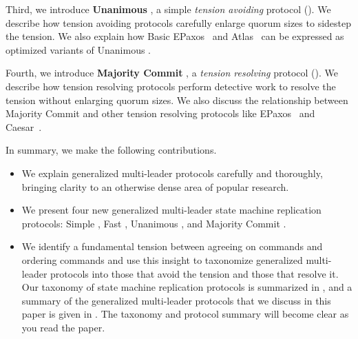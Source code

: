 Third, we introduce \textbf{Unanimous \BPaxos{}}, a simple \emph{tension
avoiding} protocol (). We describe how tension
avoiding protocols carefully enlarge quorum sizes to sidestep the tension. We
also explain how Basic EPaxos~\cite{moraru2013there} and
Atlas~\cite{enes2020state} can be expressed as optimized variants of Unanimous
\BPaxos{}.

Fourth, we introduce \textbf{Majority Commit \BPaxos{}}, a \emph{tension
resolving} protocol (). We describe how tension
resolving protocols perform detective work to resolve the tension without
enlarging quorum sizes.  We also discuss the relationship between Majority
Commit \BPaxos{} and other tension resolving protocols like
EPaxos~\cite{moraru2013proof} and Caesar~\cite{arun2017speeding}.

In summary, we make the following contributions.
\begin{itemize}
  \item
    We explain generalized multi-leader protocols carefully and thoroughly,
    bringing clarity to an otherwise dense area of popular research.

  \item
    We present four new generalized multi-leader state machine replication
    protocols: Simple \BPaxos{}, Fast \BPaxos{}, Unanimous \BPaxos{}, and
    Majority Commit \BPaxos{}.

  \item
    We identify a fundamental tension between agreeing on commands and ordering
    commands and use this insight to taxonomize generalized multi-leader
    protocols into those that avoid the tension and those that resolve it. Our
    taxonomy of state machine replication protocols is summarized in
    , and a summary of the generalized multi-leader protocols
    that we discuss in this paper is given in . The
    taxonomy and protocol summary will become clear as you read the paper.
\end{itemize}



